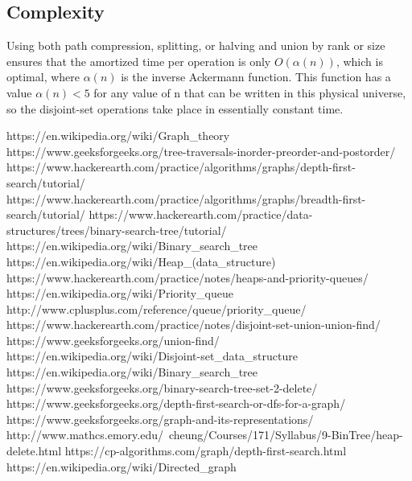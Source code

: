 \documentclass[12pt]{article}
\begin{document}
\subsection{Complexity}
Using both path compression, splitting, or halving and union by rank or size ensures that the amortized time per operation is only $\displaystyle O(\alpha (n))$,  which is optimal, where $\displaystyle \alpha (n)$ is the inverse Ackermann function. This function has a value $\displaystyle \alpha (n)<5$  for any value of n that can be written in this physical universe, so the disjoint-set operations take place in essentially constant time.
\begin{thebibliography}{9}

https://en.wikipedia.org/wiki/Graph\_theory
https://www.geeksforgeeks.org/tree-traversals-inorder-preorder-and-postorder/
https://www.hackerearth.com/practice/algorithms/graphs/depth-first-search/tutorial/
   https://www.hackerearth.com/practice/algorithms/graphs/breadth-first-search/tutorial/
   https://www.hackerearth.com/practice/data-structures/trees/binary-search-tree/tutorial/
https://en.wikipedia.org/wiki/Binary\_search\_tree
https://en.wikipedia.org/wiki/Heap\_(data\_structure)
https://www.hackerearth.com/practice/notes/heaps-and-priority-queues/
https://en.wikipedia.org/wiki/Priority\_queue
http://www.cplusplus.com/reference/queue/priority\_queue/
https://www.hackerearth.com/practice/notes/disjoint-set-union-union-find/
https://www.geeksforgeeks.org/union-find/
https://en.wikipedia.org/wiki/Disjoint-set\_data\_structure
https://en.wikipedia.org/wiki/Binary\_search\_tree
https://www.geeksforgeeks.org/binary-search-tree-set-2-delete/
https://www.geeksforgeeks.org/depth-first-search-or-dfs-for-a-graph/
https://www.geeksforgeeks.org/graph-and-its-representations/
http://www.mathcs.emory.edu/~cheung/Courses/171/Syllabus/9-BinTree/heap-delete.html
https://cp-algorithms.com/graph/depth-first-search.html
https://en.wikipedia.org/wiki/Directed\_graph
\end{thebibliography}        
\end{document}
